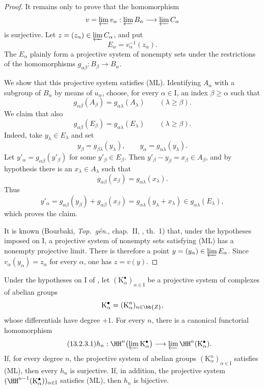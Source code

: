 \begin{proof}
It remains only to prove that the homomorphism
\[
  v=\varprojlim v_\alpha:
  \varprojlim B_\alpha\longrightarrow\varprojlim C_\alpha
\]
is surjective.
Let $z=(z_\alpha)\in\varprojlim C_\alpha$, and put
\[
  E_\alpha=v_\alpha^{-1}(z_\alpha).
\]
The $E_\alpha$ plainly form a projective system of nonempty sets under
the restrictions of the homomorphisms
$g_{\alpha\beta}:B_\beta\longrightarrow B_\alpha$.

We show that this projective system satisfies (ML).
Identifying $A_\alpha$ with a subgroup of $B_\alpha$ by means of
$u_\alpha$, choose, for every $\alpha\in\mathrm{I}$, an index
$\beta\geq\alpha$ such that
\[
  g_{\alpha\beta}(A_\beta)
  =
  g_{\alpha\lambda}(A_\lambda)
  \qquad(\lambda\geq\beta).
\]
We claim that also
\[
  g_{\alpha\beta}(E_\beta)
  =
  g_{\alpha\lambda}(E_\lambda)
  \qquad(\lambda\geq\beta).
\]
Indeed, take $y_\lambda\in E_\lambda$ and set
\[
  y_\beta=g_{\beta\lambda}(y_\lambda),
  \qquad
  y_\alpha=g_{\alpha\lambda}(y_\lambda).
\]
Let $y'_\alpha=g_{\alpha\beta}(y'_\beta)$ for some
$y'_\beta\in E_\beta$.
Then $y'_\beta-y_\beta=x_\beta\in A_\beta$, and by hypothesis there
is an $x_\lambda\in A_\lambda$ such that
\[
  g_{\alpha\beta}(x_\beta)
  =
  g_{\alpha\lambda}(x_\lambda).
\]
Thus
\[
  y'_\alpha
  =
  g_{\alpha\beta}(y_\beta)+g_{\alpha\beta}(x_\beta)
  =
  g_{\alpha\lambda}(y_\lambda+x_\lambda)
  \in g_{\alpha\lambda}(E_\lambda),
\]
which proves the claim.

It is known (Bourbaki, \emph{Top.\ g\'{e}n.}, chap.~II,
, th.~1) that, under the hypotheses imposed on
$\mathrm{I}$, a projective system of nonempty sets satisfying (ML)
has a nonempty projective limit.
There is therefore a point
$y=(y_\alpha)\in\varprojlim E_\alpha$.
Since $v_\alpha(y_\alpha)=z_\alpha$ for every $\alpha$, one has
$z=v(y)$.
\end{proof}

\begin{proposition}[13.2.3]
\label{0.13.2.3}
Under the hypotheses on $\mathrm{I}$ of , let
$(\mathrm{K}^\bullet_\alpha)_{\alpha\in\mathrm{I}}$ be a projective
system of complexes of abelian groups
\[
  \mathrm{K}^\bullet_\alpha
  =
  (\mathrm{K}^n_\alpha)_{n\in\bb{Z}},
\]
whose differentials have degree $+1$.
For every $n$, there is a canonical functorial homomorphism
\begin{equation}
\label{0.13.2.3.1}
\tag{13.2.3.1}
  h_n:
  \HH^n\bigl(\varprojlim\mathrm{K}^\bullet_\alpha\bigr)
  \longrightarrow
  \varprojlim\HH^n(\mathrm{K}^\bullet_\alpha).
\end{equation}
If, for every degree $n$, the projective system of abelian groups
$(\mathrm{K}^n_\alpha)_{\alpha\in\mathrm{I}}$ satisfies {\rm(ML)},
then every $h_n$ is surjective.
If, in addition, the projective system
$(\HH^{n-1}(\mathrm{K}^\bullet_\alpha))_{\alpha\in\mathrm{I}}$
satisfies {\rm(ML)}, then $h_n$ is bijective.
\end{proposition}

